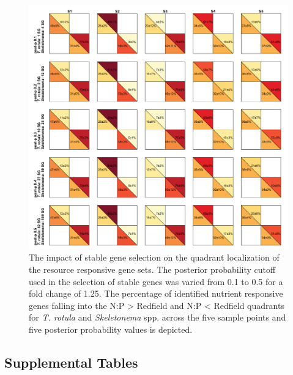 
\begin{figure}[p!]
  \centering
    \includegraphics[width=1\textwidth]{Images/C3_SFigure11_Quadrant.pdf}
    \caption[The impact of stable gene selction of quadrant localization]{The impact of stable gene selection on the quadrant localization of the resource responsive gene sets. The posterior probability cutoff used in the selection of stable genes was varied from 0.1 to 0.5 for a fold change of 1.25. The percentage of identified nutrient responsive genes falling into the N:P > Redfield and N:P < Redfield quadrants for \textit{T. rotula} and \textit{Skeletonema} spp. across the five sample points and five posterior probability values is depicted.}
  \label{fig:a3f11}
\end{figure}



\subsection{Supplemental Tables}

